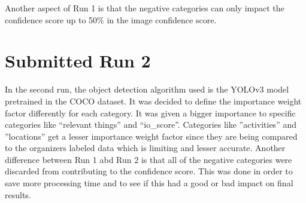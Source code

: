     Another aspect of Run 1 is that the negative categories can only impact the confidence score up to 50\% in the image confidence score.
    
 

    \section{Submitted Run 2}
    \label{sec:run2}
    
    In the second run, the object detection algorithm used is the YOLOv3 model pretrained in the COCO dataset.  It was decided to define the importance weight factor differently for each category. It was given a bigger importance to specific categories like \enquote{relevant things} and \enquote{io\_score}. Categories like ”activities” and ”locations” get a lesser importance weight factor since they are being compared to the organizers labeled data which is limiting and lesser accurate.  Another difference between Run 1 abd Run 2 is that all of the negative categories were discarded from contributing to the confidence score. This was done in order to save more processing time and to see if this had a good or bad impact on final results.
    
